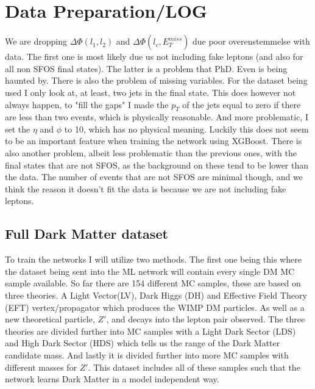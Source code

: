 \documentclass[14pt, a4paper]{book}
\begin{document}
\graphicspath{{../../figures/}}
\section{Data Preparation/LOG}
We are dropping $\Delta\Phi(l_1,l_2)$ and $\Delta\Phi(l_c,E_T^{miss})$ due poor overenstemmelse with data. The first one is most likely due us not including fake leptons (and also for all non SFOS final states). The latter is a problem that PhD. Even is being haunted by. There is also the problem of missing variables. For the dataset being used I only look at, at least, two jets in the final state. This does however not always happen, to "fill the gaps" I made the $p_T$ of the jets equal to zero if there are less than two events, which is physically reasonable. And more problematic, I set the $\eta$ and $\phi$ to 10, which has no physical meaning. Luckily this does not seem to be an important feature when training the network using XGBoost. There is also another problem, albeit less problematic than the previous ones, with the final states that are not SFOS, as the background on these tend to be lower than the data. The number of events that are not SFOS are minimal though, and we think the reason it doesn't fit the data is because we are not including fake leptons.

\subsection{Full Dark Matter dataset}
To train the networks I will utilize two methods. The first one being this where the dataset being sent into the ML network will contain every single DM MC sample available. So far there are 154 different MC samples, these are based on three theories. A Light Vector(LV), Dark Higgs (DH) and Effective Field Theory (EFT) vertex/propagator which produces the WIMP DM particles. As well as a new theoretical particle, $Z'$, and decays into the lepton pair observed. The three theories are divided further into MC samples with a Light Dark Sector (LDS) and High Dark Sector (HDS) which tells us the range of the Dark Matter candidate mass. And lastly it is divided further into more MC samples with different masses for $Z'$. This dataset includes all of these samples such that the network learns Dark Matter in a model independent way.
\end{document}
